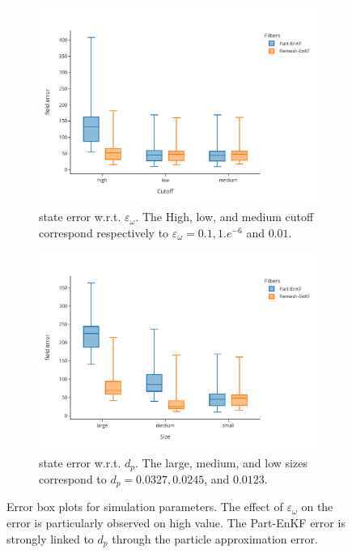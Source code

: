 \begin{figure}[h!]
    \centering

    \begin{subfigure}{0.48\textwidth}
        \centering
        \includegraphics[width=\linewidth]{./images/app2d/final/MSE_cutoff_box.pdf}
        \caption{state error w.r.t. $\varepsilon_{\omega}$. The High, low, and medium cutoff correspond respectively to $\varepsilon_{\omega} = 0.1, 1.e^{-6}$ and $0.01$.}
        \label{fig:cuttoff}
    \end{subfigure}
    \hfill
    \begin{subfigure}{0.48\textwidth}
        \centering
        \includegraphics[width=\linewidth]{./images/app2d/final/MSE_size_box.pdf}
        \caption{state error w.r.t. $d_p$. The large, medium, and low sizes correspond to $d_p = 0.0327, 0.0245$, and $0.0123$.}
        \label{fig:np}
    \end{subfigure}

    \caption{Error box plots for simulation parameters. The effect of $\varepsilon_{\omega}$ on the error is particularly observed on high value. The Part-EnKF error is strongly linked to $d_p$ through the particle approximation error.}
    \label{fig:simu_parameters_error}
\end{figure}

